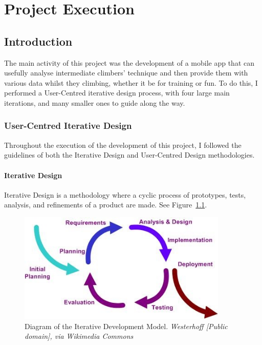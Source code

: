 \chapter{Project Execution}
\label{chap:execution}


\section{Introduction}
The main activity of this project was the development of a mobile app that can usefully analyse intermediate climbers' technique and then provide them with various data whilst they climbing, whether it be for training or fun.
To do this, I performed a User-Centred iterative design process, with four large main iterations, and many smaller ones to guide along the way.


\subsection{User-Centred Iterative Design}
Throughout the execution of the development of this project, I followed the guidelines of both the Iterative Design and User-Centred Design methodologies.

\subsubsection{Iterative Design}
Iterative Design is a methodology where a cyclic process of prototypes, tests, analysis, and refinements of a product are made.
See Figure~\ref{fig:iter}.


\begin{figure}[h]
\centering
\includegraphics[width=10cm]{imgs/iterativeloop}
\caption{Diagram of the Iterative Development Model. \newline \textit{\small Westerhoff [Public domain], via Wikimedia Commons}}
\label{fig:iter}
\end{figure}


